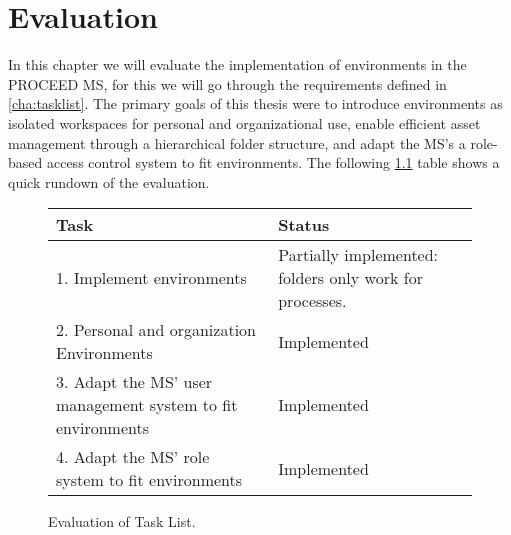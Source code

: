\chapter{Evaluation}
\label{cha:evaluation}

In this chapter we will evaluate the implementation of environments in the PROCEED MS,
for this we will go through the requirements defined in \ref{cha:tasklist}.
The primary goals of this thesis were to introduce environments as isolated workspaces for personal and organizational use,
enable efficient asset management through a hierarchical folder structure,
and adapt the MS's a role-based access control system to fit environments.
The following \ref{fig:quick-evaluation} table shows a quick rundown of the evaluation.


\begin{figure}[H]
	\centering

	\begin{tabular}{ | m{20em} | m{17em}| }
		\hline
		 Task & Status \\
     \hline
      1. Implement environments &  Partially implemented: folders only work for processes. \\
     \hline
      2. Personal and organization Environments &  Implemented \\
     \hline
      3. Adapt the MS' user management system to fit environments &  Implemented \\
     \hline
      4. Adapt the MS' role system to fit environments &  Implemented \\
     \hline
	\end{tabular}

	\caption{Evaluation of Task List.}
	\label{fig:quick-evaluation}
\end{figure}

